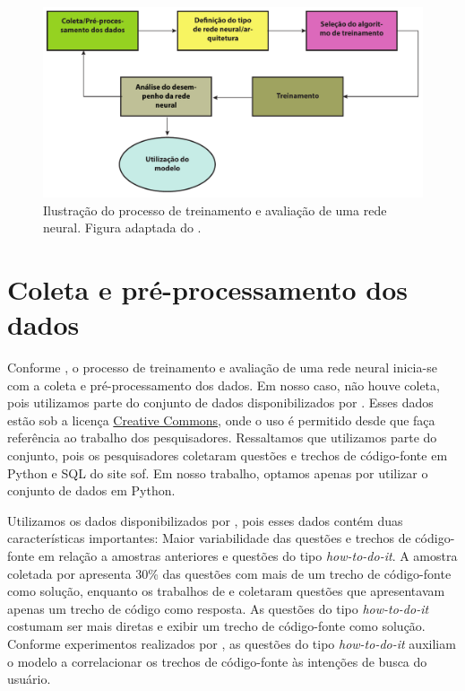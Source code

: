 \begin{figure}[H]
\centering
\includegraphics[width=1\textwidth]{figuras/cap-experimento/neural_network_training_lifecycle_dissertation.pdf}
\caption{Ilustração do processo de treinamento e avaliação de uma rede neural. Figura adaptada do \cite{nndesign:2014:pratical-training-issues}.} 
\label{fig:training-neural-network-cyclic}
\end{figure}

\section{Coleta e pré-processamento dos dados}
\label{sec:coleta-pre-processamento-dos-dados}

Conforme \cite{nndesign:2014:pratical-training-issues}, o processo de treinamento e avaliação de uma rede neural inicia-se com a coleta e pré-processamento dos dados. Em nosso caso, não houve coleta, pois utilizamos parte do conjunto de dados disponibilizados por \cite{yao-2018}. Esses dados estão sob a licença \href{https://creativecommons.org/licenses/by/4.0/}{Creative Commons}, onde o uso é permitido desde que faça referência ao trabalho dos pesquisadores. Ressaltamos que utilizamos parte do conjunto, pois os pesquisadores coletaram questões e trechos de código-fonte em Python e SQL do site \Gls{sof}. Em nosso trabalho, optamos apenas por utilizar o conjunto de dados em Python. 


Utilizamos os dados disponibilizados por \cite{yao-2018}, pois esses dados contém duas características importantes: Maior variabilidade das questões e trechos de código-fonte em relação a amostras anteriores \citep{iyer-etal-2016-summarizing, Allamanis-bimodal-source-code-natural-language:2015} e questões do tipo \textit{how-to-do-it}. A amostra coletada por \cite{yao-2018} apresenta 30\% das questões com mais de um trecho de código-fonte como solução, enquanto os trabalhos de \cite{iyer-etal-2016-summarizing} e \cite{Allamanis-bimodal-source-code-natural-language:2015} coletaram questões que apresentavam apenas um trecho de código como resposta. As questões do tipo \textit{how-to-do-it} costumam ser mais diretas e exibir um trecho de código-fonte como solução. Conforme experimentos realizados por \cite{yao-2018}, as questões do tipo \textit{how-to-do-it} auxiliam o modelo a correlacionar os trechos de código-fonte às intenções de busca do usuário.


